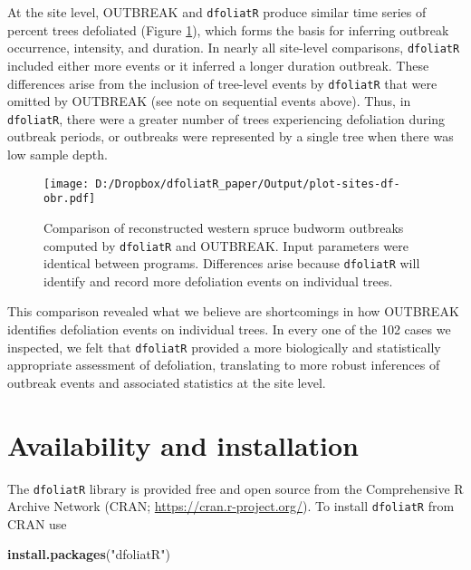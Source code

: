 \documentclass[review]{elsarticle} %
\makeatletter
\newenvironment{Shaded}{\begin{snugshade}}{\end{snugshade}}
\newcommand{\KeywordTok}[1]{\textcolor[rgb]{0.13,0.29,0.53}{\textbf{#1}}}
\newcommand{\NormalTok}[1]{#1}
\newcommand{\StringTok}[1]{\textcolor[rgb]{0.31,0.60,0.02}{#1}}
\def\maxwidth{\ifdim\Gin@nat@width>\linewidth\linewidth
\else\Gin@nat@width\fi}
\let\Oldincludegraphics\includegraphics
\renewcommand{\includegraphics}[1]{\Oldincludegraphics[width=\maxwidth]{#1}}
\makeatother
\begin{document}
At the site level, OUTBREAK and \texttt{dfoliatR} produce similar time series of percent trees defoliated (Figure \ref{fig:fig-df-obr}), which forms the basis for inferring outbreak occurrence, intensity, and duration. In nearly all site-level comparisons, \texttt{dfoliatR} included either more events or it inferred a longer duration outbreak. These differences arise from the inclusion of tree-level events by \texttt{dfoliatR} that were omitted by OUTBREAK (see note on sequential events above). Thus, in \texttt{dfoliatR}, there were a greater number of trees experiencing defoliation during outbreak periods, or outbreaks were represented by a single tree when
there was low sample depth.



\begin{figure}
\centering
\texttt{[image: D:/Dropbox/dfoliatR\_paper/Output/plot-sites-df-obr.pdf]}
\caption{\label{fig:fig-df-obr}Comparison of reconstructed western spruce budworm outbreaks computed by \texttt{dfoliatR} and OUTBREAK. Input parameters were identical between programs. Differences arise because \texttt{dfoliatR} will identify and record more defoliation events on individual trees.}
\end{figure}

This comparison revealed what we believe are shortcomings in how OUTBREAK identifies defoliation events on individual trees. In every one of the 102 cases we inspected, we felt that \texttt{dfoliatR} provided a more biologically and statistically appropriate assessment of defoliation, translating to more robust inferences of outbreak events and associated statistics at the site level.

\hypertarget{availability-and-installation}{%
\section{Availability and installation}\label{availability-and-installation}}

The \texttt{dfoliatR} library is provided free and open source from the Comprehensive R Archive Network (CRAN; \url{https://cran.r-project.org/}). To install \texttt{dfoliatR} from CRAN use

\begin{Shaded}
\begin{Highlighting}[]
\KeywordTok{install.packages}\NormalTok{(}\StringTok{"dfoliatR"}\NormalTok{)}
\end{Highlighting}
\end{Shaded}
\end{document}
